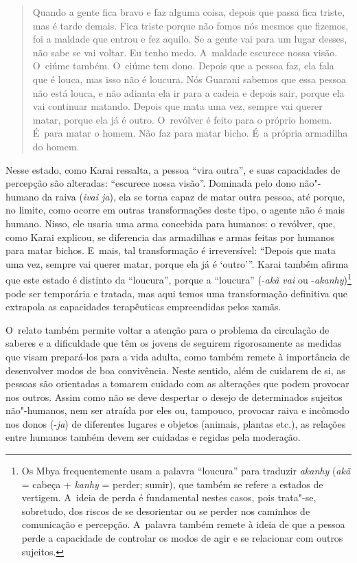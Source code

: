 \begin{quote}
\noindent
Quando a gente fica bravo e faz alguma coisa, depois que passa fica
triste, mas é tarde demais. Fica triste porque não fomos nós mesmos que
fizemos, foi a maldade que entrou e fez aquilo. Se a gente vai para um
lugar desses, não sabe se vai voltar. Eu tenho medo. A~maldade escurece
nossa visão. O~ciúme também. O~ciúme tem dono. Depois que a pessoa faz,
ela fala que é louca, mas isso não é loucura. Nós Guarani sabemos que
essa pessoa não está louca, e não adianta ela ir para a cadeia e depois
sair, porque ela vai continuar matando. Depois que mata uma vez, sempre
vai querer matar, porque ela já é outro. O~revólver é feito para o
próprio homem. É~para matar o homem. Não faz para matar bicho. É~a
própria armadilha do homem.
\end{quote}

\indent
Nesse estado, como Karai ressalta, a pessoa ``vira outra'', e suas
capacidades de percepção são alteradas: ``escurece nossa visão''.
Dominada pelo dono não"-humano da raiva (\emph{ivai ja}), ela se torna capaz de
matar outra pessoa, até porque, no limite, como ocorre em outras
transformações deste tipo, o agente não é mais humano. Nisso, ele
usaria uma arma concebida para humanos: o revólver, que, como Karai
explicou, se diferencia das armadilhas e armas feitas por humanos para
matar bichos. E~mais, tal transformação é irreversível: ``Depois que
mata uma vez, sempre vai querer matar, porque ela já é ‘outro’''. Karai
também afirma que este estado é distinto da ``loucura'', porque a
``loucura'' (-\emph{akã vai} ou -\emph{akanhy})\footnote{Os Mbya frequentemente usam
a palavra ``loucura'' para traduzir \emph{akanhy} (\emph{akã} = cabeça + \emph{kanhy} =
perder; sumir), que também se refere a estados de vertigem. A~ideia de
perda é fundamental nestes casos, pois trata"-se, sobretudo, dos riscos
de se desorientar ou se perder nos caminhos de comunicação e percepção.
A~palavra também remete à ideia de que a pessoa perde a capacidade de
controlar os modos de agir e se relacionar com outros sujeitos.} pode
ser temporária e tratada, mas aqui temos uma transformação definitiva
que extrapola as capacidades terapêuticas empreendidas pelos xamãs. 

O~relato também permite voltar a atenção para o problema da circulação
de saberes e a dificuldade que têm os jovens de seguirem rigorosamente
as medidas que visam prepará-los para a vida adulta, como também remete
à importância de desenvolver modos de boa convivência. Neste sentido,
além de cuidarem de si, as pessoas são orientadas a tomarem cuidado com
as alterações que podem provocar nos outros. Assim como não se deve
despertar o desejo de determinados sujeitos não"-humanos, nem ser
atraída por eles ou, tampouco, provocar raiva e incômodo nos donos
(-\emph{ja}) de diferentes lugares e objetos (animais, plantas etc.), as
relações entre humanos também devem ser cuidadas e regidas pela
moderação. 

